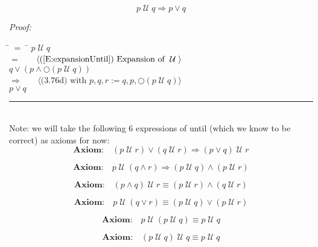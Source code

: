 \documentclass[fleqn, leqno]{article}
\newcommand{\lgap}{2pt}                             %
\newcommand{\mymathindent}{24pt}                    %
\newcommand{\Until}{\;\mathcal{U}\;}
\newcommand{\Next}{\bigcirc}
\newcommand{\myqed}{\hfill\rule[-.23ex]{1.2ex}{2.0ex}}
\newcommand{\Gll} {\langle}                         %
\newcommand{\Ggg} {\rangle}                         %
\newcommand{\Hint}[1]     {\ \ \ $\Gll              \mbox{#1} \Ggg$ }   %
\begin{document}
\begin{equation}\label{E:untilImpOr}
p \Until q \Rightarrow p \lor q
\end{equation}

\emph{Proof:}
\begin{tabbing}
\hspace{\mymathindent} \= $= \;$ \= \kill
  \> \>   $p \Until q$\\[\lgap]
  \> $=$  \>  \Hint{(\ref{E:expansionUntil}) Expansion of $\Until$}\\[\lgap]
  \> \>   $q \lor (p \land \Next(p \Until q))$\\[\lgap]
  \> $\Rightarrow$  \>  \Hint{(3.76d) with $p,q,r := q,p,\Next(p \Until q)$}\\[\lgap]
  \> \>   $p \lor q$\\[\lgap]
\end{tabbing}
\myqed\\[\lgap]


Note: we will take the following 6 expressions of until (which we know to be correct) as axioms for now:\\

\begin{equation}\label{E:untilOrImp}
\textbf{Axiom:}\quad (p \Until r) \lor (q \Until r) \Rightarrow (p \lor q) \Until r
\end{equation}

\begin{equation}\label{E:untilAndImp}
\textbf{Axiom:}\quad p \Until (q \land r) \Rightarrow (p \Until q) \land (p \Until r)
\end{equation}

\begin{equation}\label{E:untilAndEquiv}
\textbf{Axiom:}\quad (p \land q) \Until r \equiv (p \Until r) \land (q \Until r)
\end{equation}

\begin{equation}\label{E:untilOrEquiv}
\textbf{Axiom:}\quad p \Until (q \lor r) \equiv (p \Until q) \lor (p \Until r)
\end{equation}

\begin{equation}\label{E:untilIdem}
\textbf{Axiom:}\quad p \Until (p \Until q) \equiv p \Until q
\end{equation}

\begin{equation}\label{E:untilIdemR}
\textbf{Axiom:}\quad (p \Until q) \Until q \equiv p \Until q
\end{equation}
\end{document}
